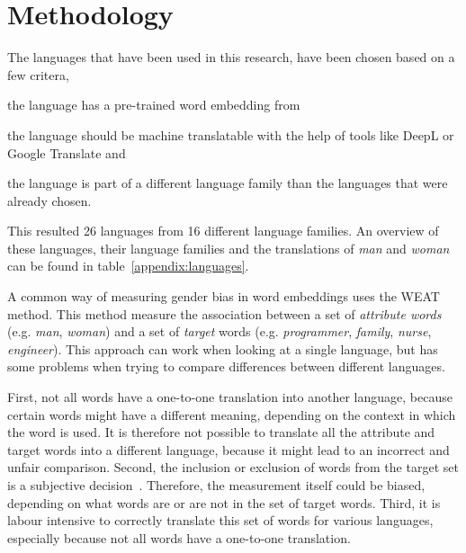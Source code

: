 \section{Methodology}
The languages that have been used in this research, have been chosen based on a 
few critera, 
\begin{seriate}
    \item the language has a pre-trained word embedding from \textcite{grave2018learning}
    \item the language should be machine translatable with the help of tools like DeepL or
    Google Translate and
    \item the language is part of a different language family than the languages that
    were already chosen.
\end{seriate}
This resulted 26 languages from 16 different language families. An overview of these languages, their language families and the translations of \textit{man} and \textit{woman}
can be found in table~\ref{appendix:languages}.

A common way of measuring gender bias in word embeddings uses the 
WEAT~\parencite{caliskan_2017_semantics_language_corpora} method. This method measure the
association between a set of \textit{attribute words} (e.g. \textit{man}, \textit{woman}) 
and a set of \textit{target} words (e.g. \textit{programmer}, \textit{family}, \textit{nurse}, \textit{engineer}). This
approach can work when looking at a single language, but has some problems when 
trying to compare differences between
different languages. 

First, not all words have a one-to-one translation into another
language, because certain words might have a different meaning, depending on the
context in which the word is used. It is therefore not possible to translate all the
attribute and target words into a different language, because it might lead to an
incorrect and unfair comparison. 
Second, the inclusion or exclusion of words from
the target set is a subjective decision~\parencite{nissim_fair_is_better_2020}. Therefore,
the measurement itself could be biased, depending on what words are or are not in the set of target words.
Third, it is labour intensive to correctly translate this set of words for various languages, especially because not all words have a one-to-one translation.

